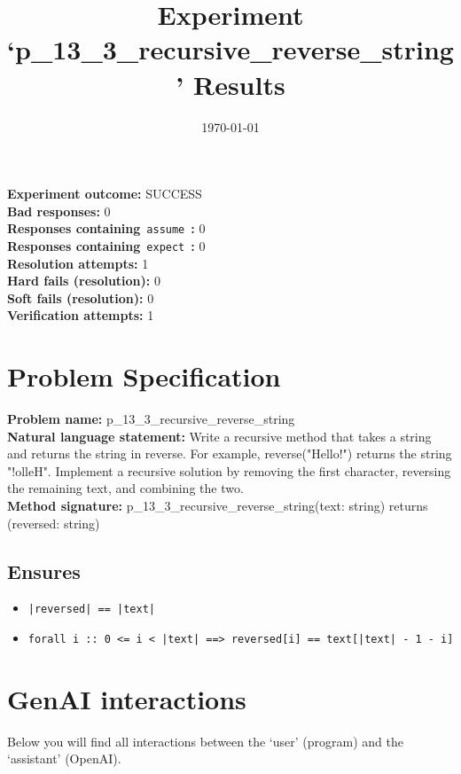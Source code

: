 \documentclass{article}
\begin{document}
\title{Experiment `p\_13\_3\_recursive\_reverse\_string' Results}
\author{\today}
\date{}
\maketitle
\textbf{Experiment outcome: }SUCCESS
\\\textbf{Bad responses: }0
\\\textbf{Responses containing}~\texttt{assume}~\textbf{: }0
\\\textbf{Responses containing}~\texttt{expect}~\textbf{: }0
\\\textbf{Resolution attempts: }1
\\\textbf{Hard fails (resolution): }0
\\\textbf{Soft fails (resolution): }0
\\\textbf{Verification attempts: }1
\section*{Problem Specification}
\textbf{Problem name: }p\_13\_3\_recursive\_reverse\_string
\\\textbf{Natural language statement: }Write a recursive method that takes a string and returns the string in reverse. For example, reverse("Hello!") returns the string "!olleH". Implement a recursive solution by removing the first character, reversing the remaining text, and combining the two.
\\\textbf{Method signature: }p\_13\_3\_recursive\_reverse\_string(text: string) returns (reversed: string)
\subsection*{Ensures}
\begin{itemize}
\item \texttt{|reversed| == |text|}
\item \texttt{forall i :: 0 <= i < |text| ==> reversed[i] == text[|text| - 1 - i]}
\end{itemize}
\clearpage
\section*{GenAI interactions}
Below you will find all interactions between the `user' (program) and the `assistant' (OpenAI).
\end{document}

